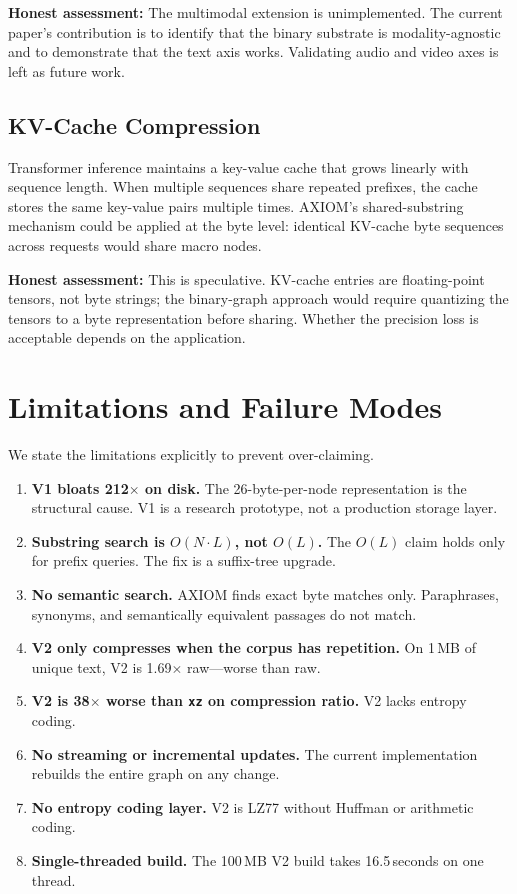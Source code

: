 \documentclass[conference]{IEEEtran}
\begin{document}
\textbf{Honest assessment:} The multimodal extension is unimplemented. The current paper's contribution is to identify that the binary substrate is modality-agnostic and to demonstrate that the text axis works. Validating audio and video axes is left as future work.

\subsection{KV-Cache Compression}

Transformer inference maintains a key-value cache that grows linearly with sequence length. When multiple sequences share repeated prefixes, the cache stores the same key-value pairs multiple times. AXIOM's shared-substring mechanism could be applied at the byte level: identical KV-cache byte sequences across requests would share macro nodes.

\textbf{Honest assessment:} This is speculative. KV-cache entries are floating-point tensors, not byte strings; the binary-graph approach would require quantizing the tensors to a byte representation before sharing. Whether the precision loss is acceptable depends on the application.

\section{Limitations and Failure Modes}

We state the limitations explicitly to prevent over-claiming.

\begin{enumerate}
\item \textbf{V1 bloats 212$\times$ on disk.} The 26-byte-per-node representation is the structural cause. V1 is a research prototype, not a production storage layer.
\item \textbf{Substring search is $O(N{\cdot}L)$, not $O(L)$.} The $O(L)$ claim holds only for prefix queries. The fix is a suffix-tree upgrade.
\item \textbf{No semantic search.} AXIOM finds exact byte matches only. Paraphrases, synonyms, and semantically equivalent passages do not match.
\item \textbf{V2 only compresses when the corpus has repetition.} On 1\,MB of unique text, V2 is 1.69$\times$ raw---worse than raw.
\item \textbf{V2 is 38$\times$ worse than \texttt{xz} on compression ratio.} V2 lacks entropy coding.
\item \textbf{No streaming or incremental updates.} The current implementation rebuilds the entire graph on any change.
\item \textbf{No entropy coding layer.} V2 is LZ77 without Huffman or arithmetic coding.
\item \textbf{Single-threaded build.} The 100\,MB V2 build takes 16.5\,seconds on one thread.
\end{enumerate}
\end{document}
